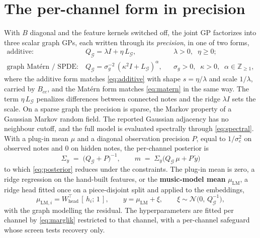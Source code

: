 \documentclass[11pt,a4paper]{report}
\newcommand{\N}{\mathcal{N}}
\newcommand{\graph}{\mathcal{G}}
\newcommand{\Qg}{Q_{\graph}}
\newcommand{\Lg}{L_{\graph}}
\newcommand{\muLM}{\mu_{\mathrm{LM}}}  %
\newcommand{\Sy}{\Sigma_y}             %
\begin{document}
\section{The per-channel form in precision}
With $B$ diagonal and the feature kernels switched off, the joint GP
factorizes into three scalar graph GPs, each written through its
\emph{precision}, in one of two forms,
\begin{align}
  \text{additive:} \quad & \Qg = \lambda I + \eta\, \Lg,
      && \lambda > 0,\;\; \eta \ge 0;
  \label{eq:additive-prec}\\[2pt]
  \text{graph Mat\'ern / SPDE:} \quad & \Qg = \sigma_g^{-2}\,(\kappa^2 I + \Lg)^{\alpha},
      && \sigma_g > 0,\;\; \kappa > 0,\;\; \alpha \in \mathbb{Z}_{\ge 1},
  \label{eq:matern-prec}
\end{align}
where the additive form matches \eqref{eq:additive} with shape
$s = \eta / \lambda$ and scale $1/\lambda$, carried by $B_{cc}$, and the
Mat\'ern form matches \eqref{eq:matern} in the same way. The term
$\eta\,\Lg$ penalizes differences between connected notes and the ridge
$\lambda I$ sets the scale. On a sparse graph the precision is sparse, the
Markov property of a Gaussian Markov random field. The reported Gaussian
adjacency has no neighbour cutoff, and the full model is evaluated
spectrally through \eqref{eq:spectral}. With a plug-in mean $\mu$ and a
diagonal observation precision $P$, equal to $1/\sigma_e^2$ on observed
notes and $0$ on hidden notes, the per-channel posterior is
\begin{equation}
  \Sy \;=\; \bigl(\Qg + P\bigr)^{-1}, \qquad
  m \;=\; \Sy \bigl(\Qg\, \mu + P\, \tilde y\bigr)
  \label{eq:posterior-chan}
\end{equation}
to which \eqref{eq:posterior} reduces under the constraints. The plug-in
mean is zero, a ridge regression on the hand-built features, or the
\textbf{music-model mean} $\muLM$, a ridge head fitted once on a
piece-disjoint split and applied to the embeddings,
\begin{equation}
  \mu_{\mathrm{LM},i} = W_{\mathrm{head}}^{\top}\,[\, h_i;\, 1\,],
  \qquad
  y = \muLM + \xi, \qquad \xi \sim \N\!\bigl(0,\, \Qg^{-1}\bigr),
  \label{eq:lm-mean}
\end{equation}
with the graph modelling the residual. The hyperparameters are fitted per
channel by \eqref{eq:marglik} restricted to that channel, with a
per-channel safeguard whose screen tests recovery only.

\end{document}

